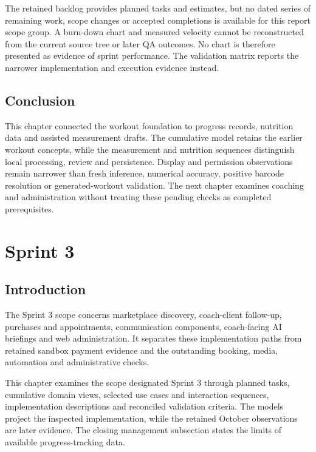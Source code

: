 \documentclass[12pt,a4paper,openany]{report}
\begin{document}
The retained backlog provides planned tasks and estimates, but no dated series of remaining work, scope changes or accepted completions is available for this report scope group. A burn-down chart and measured velocity cannot be reconstructed from the current source tree or later QA outcomes. No chart is therefore presented as evidence of sprint performance. The validation matrix reports the narrower implementation and execution evidence instead.


\section*{Conclusion}

This chapter connected the workout foundation to progress records, nutrition data and assisted measurement drafts. The cumulative model retains the earlier workout concepts, while the measurement and nutrition sequences distinguish local processing, review and persistence. Display and permission observations remain narrower than fresh inference, numerical accuracy, positive barcode resolution or generated-workout validation. The next chapter examines coaching and administration without treating these pending checks as completed prerequisites.


\chapter{Sprint 3}


\section*{Introduction}

The Sprint 3 scope concerns marketplace discovery, coach-client follow-up, purchases and appointments, communication components, coach-facing AI briefings and web administration. It separates these implementation paths from retained sandbox payment evidence and the outstanding booking, media, automation and administrative checks.


This chapter examines the scope designated Sprint 3 through planned tasks, cumulative domain views, selected use cases and interaction sequences, implementation descriptions and reconciled validation criteria. The models project the inspected implementation, while the retained October observations are later evidence. The closing management subsection states the limits of available progress-tracking data.
\end{document}

